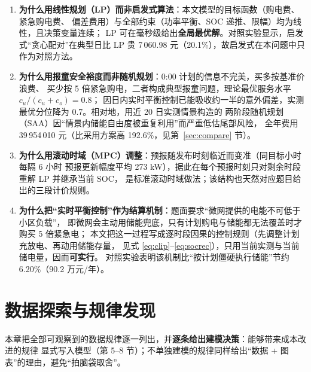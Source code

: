 \documentclass[12pt,a4paper,fontset=fandol]{ctexart}
\begin{document}
\begin{enumerate}[label=(\arabic*), leftmargin=2.2em, itemsep=2pt]
\item \textbf{为什么用线性规划（LP\nobreak）而非启发式算法}\nobreak：本文模型的目标函数（购电费\nobreak、紧急购电费\nobreak、
偏差费用\nobreak）与全部约束（功率平衡\nobreak、SOC 递推\nobreak、限幅\nobreak）均为线性\nobreak，且决策变量连续\nobreak；
LP 可在毫秒级给出\textbf{全局最优解}\nobreak。对照实验显示\nobreak，启发式“贪心配对\nobreak”在典型日比 LP 贵
7\,060.98 元（20.1\%\nobreak）\nobreak，故启发式在本问题中只作为对照方法\nobreak。
\item \textbf{为什么用报童安全裕度而非随机规划}\nobreak：0:00 计划的信息不完美\nobreak，买多按基准价浪费\nobreak、
买少按 5 倍紧急购电\nobreak，二者构成典型报童问题\nobreak，理论最优服务水平 $c_u/(c_u+c_o)=0.8$\nobreak；
因日内实时平衡控制已能吸收约一半的意外偏差\nobreak，实测最优分位降为 0.7\nobreak。相对地\nobreak，用近 20 日实测情景构造的
两阶段随机规划（SAA\nobreak）因“情景内储能自由度被重复利用\nobreak”而严重低估尾部风险\nobreak，
全年费用 39\,954\,010 元（比采用方案高 192.6\%\nobreak，见第~\ref{sec:compare} 节\nobreak）\nobreak。
\item \textbf{为什么用滚动时域（MPC\nobreak）调整}\cite{mpc,cn102184475}\nobreak：预报随发布时刻临近而变准（同目标小时每隔 6 小时
预报更新幅度平均 273 kW\nobreak）\nobreak，据此在每个预报时刻只对剩余时段重解 LP 并继承当前 SOC\nobreak，
是标准滚动时域做法\nobreak；该结构也天然对应题目给出的三段计价规则\nobreak。
\item \textbf{为什么把“实时平衡控制\nobreak”作为结算机制}\nobreak：题面要求“微网提供的电能不可低于小区负载\nobreak”\nobreak，
即微网会主动用储能兜底\nobreak，只有计划购电与储能都无法覆盖时才购买 5 倍紧急电\nobreak；
本文把这一过程写成逐时段因果的控制规则（先调整计划充放电\nobreak、再动用储能存量\nobreak，
见式 \eqref{eq:clip}--\eqref{eq:socrec}\nobreak）\nobreak，只用当前实测与当前储电量\nobreak，因而\textbf{可实行}\nobreak。
对照实验表明该机制比“按计划僵硬执行储能\nobreak”节约 6.20\%（90.2 万元/年\nobreak）\nobreak。
\end{enumerate}


\section{数据探索与规律发现}

本章把全部可观察到的数据规律逐一列出\nobreak，并\textbf{逐条给出建模决策}\nobreak：能够带来成本改进的规律
显式写入模型（第 5--8 节\nobreak）\nobreak；不单独建模的规律同样给出“数据 + 图表\nobreak”的理由\nobreak，避免“拍脑袋取舍\nobreak”\nobreak。
\end{document}
